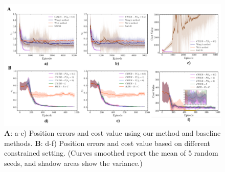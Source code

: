 \documentclass{article}
\begin{document}
\begin{figure}[!t]
  \centering
  \includegraphics[width=\hsize]{figs/Fig3.pdf}
  \caption{\textbf{A}: a-c) Position errors and cost value using our method and baseline methods. \textbf{B}: d-f) Position errors and cost value based on different constrained setting. (Curves smoothed report the mean of 5 random seeds, and shadow areas show the variance.)}
  \label{fig3}
\end{figure}

\begin{table}[!htb]
  \centering
  \caption{The best performance of different learning algorithms.The best results are marked as bold. Note that we considered its cost value is valid only if an algorithm meets the demand, $e_{1}$ or $e_{2} \leq 0.05 $.}
  \label{tab1}
\end{table}
\end{document}
